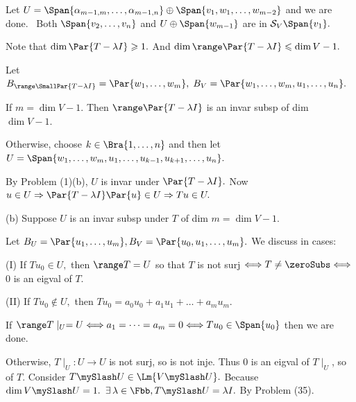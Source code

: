 Let $U=\Span{\alpha_{m-1,m},\dots,\alpha_{m-1,n}}\oplus\Span{v_1,w_1,\dots,w_{m-2}}$ and we are done.\PfEnd\quad\Ha
\Comment \,\,\,Both $\Span{v_2,\dots,v_n}$ and $U\oplus\Span{w_{m-1}}$ are in $\mathcal{S}_V \Span{v_1}.$\par\quad\Ha
{}\par\vspace{6pt}\quad\Ha
\Or Note that $\dim\null\Par{T-\lambda I}\geqslant 1.$ And $\dim\range\Par{T-\lambda I}\leqslant\dim V-1.$\par\quad\Ha
Let $B_{\range\SmallPar{T-\lambda I}}=\Par{w_1,\dots,w_m},\;B_V=\Par{w_1,\dots,w_m,u_1,\dots,u_n}.$\par\quad\Ha
If $m=\dim V-1.$  Then $\range\Par{T-\lambda I}$ is an invar subsp of dim $\dim V-1.$\par\quad\Ha
Otherwise, choose $k\in\Bra{1,\dots,n}$ and then let $U=\Span{w_1,\dots,w_m,u_1,\dots,u_{k-1},u_{k+1},\dots,u_n}.$\par\quad\Ha
By Problem (1)(b), $U$ is invar under $\Par{T-\lambda I}.$ Now $u\in U\Rightarrow \Par{T-\lambda I}\Par{u}\in U\Rightarrow Tu\in U.$\par\vspace{6pt}\quad
(b) Suppose $U$ is an invar subsp under $T$ of dim $m=\dim V-1.$ \par\quad\Hb
Let $B_U=\Par{u_1,\dots,u_m},B_V=\Par{u_0,u_1,\dots,u_m}.$ We discuss in cases:\par\quad\Hb
(I) If $Tu_0\in U,$ then $\range T=U$ so that $T$ is not surj $\Longleftrightarrow \null T\neq\zeroSubs\Longleftrightarrow$ $0$ is an eigval of $T.$\par\quad\Hb\EndI
(II) If $Tu_0\not\in U,$ then $Tu_0=a_0 u_0+a_1 u_1+\dots+a_mu_m.$\par\quad\Hb\EndII
If $\range T\mid_U=U\Longleftrightarrow a_1=\dots=a_m=0\Longleftrightarrow Tu_0\in\Span{u_0}$ then we are done.\par\quad\Hb\EndII
Otherwise, $T\mid_U:U\rightarrow U$ is not surj, so is not inje. Thus $0$ is an eigval of $T\mid_U$, so of $T.$\PfEnd\vspace{4pt}\quad\Hb
\Or Consider $T\mySlash U\in\Lm{V\mySlash U}.$ Because $\dim V\mySlash U=1.$ $\exists\,\lambda\in\Fbb,T\mySlash U=\lambda I.$ By Problem (35).\PfEnd
\SepLine
\ChEnd\pagebreak

\large\vspace{5pt}

